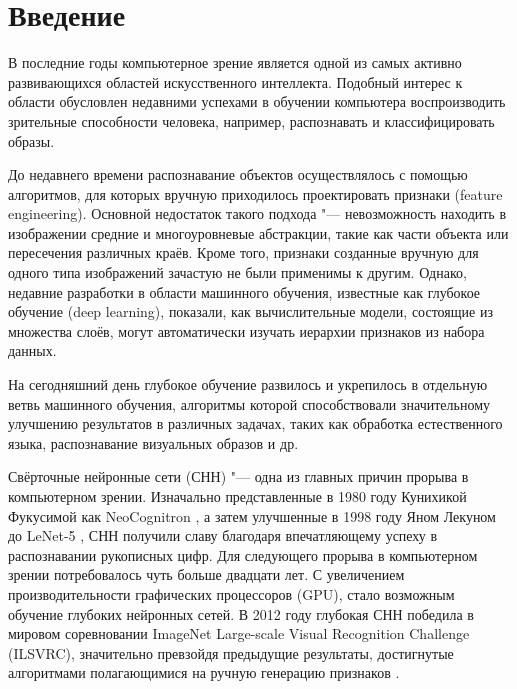 \section{Введение}
В последние годы компьютерное зрение является одной из самых активно развивающихся областей
искусственного интеллекта. Подобный интерес к области обусловлен недавними успехами в обучении
компьютера воспроизводить зрительные способности человека, например, распознавать и классифицировать образы.

До недавнего времени распознавание объектов осуществлялось с помощью 
алгоритмов, для которых вручную приходилось проектировать признаки (feature engineering). 
Основной недостаток такого подхода "--- невозможность находить в изображении 
средние и многоуровневые абстракции, такие как части объекта или пересечения различных краёв. 
Кроме того, признаки созданные вручную для одного типа изображений зачастую не были применимы к 
другим. Однако, недавние разработки в области машинного обучения, известные как глубокое 
обучение (deep learning)\cite{brief_deep_learning}, показали, как вычислительные модели, состоящие из множества слоёв, 
могут автоматически изучать иерархии признаков из набора данных.

На сегодняшний день глубокое обучение развилось и укрепилось в отдельную ветвь машинного обучения, 
алгоритмы которой способствовали значительному улучшению результатов в различных задачах, таких как 
обработка естественного языка, распознавание визуальных образов и др.

Свёрточные нейронные сети (СНН) "--- одна из главных причин прорыва в компьютерном зрении. 
Изначально представленные в 1980 году Кунихикой Фукусимой как NeoCognitron \cite{Neocognitron}, а 
затем улучшенные в 1998 году Яном Лекуном до LeNet-5 \cite{lecun-98}, СНН получили славу благодаря 
впечатляющему успеху в  распознавании рукописных цифр. Для следующего прорыва в компьютерном зрении 
потребовалось чуть больше двадцати лет. С увеличением производительности графических процессоров 
(GPU), стало возможным обучение глубоких нейронных сетей. В 2012 году глубокая СНН победила в 
мировом соревновании ImageNet Large-scale Visual Recognition Challenge (ILSVRC), значительно 
превзойдя предыдущие результаты, достигнутые алгоритмами полагающимися на ручную генерацию 
признаков \cite{NIPS2012_4824}.

